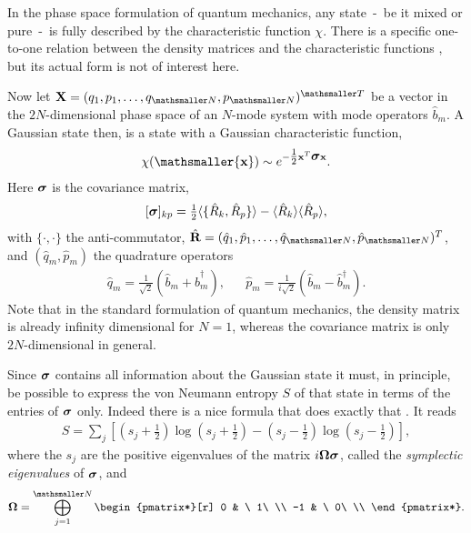 \documentclass[11pt, a4paper]{article}
\def\bx{{\bf x}}
\newcommand{\Om}{\Omega}
\newcommand{\si}{{\sigma}}
\newcommand{\sfrac}[2]{{\textstyle\frac{#1}{#2}}}
\newcommand{\half}{\sfrac{1}{2}}
\newcommand{\gv}[1]{\ensuremath{\mbox{\boldmath $#1$}}}
\newcommand{\mb}{\mathbf}
\newcommand{\ms}{\mathsmaller}
\begin{document}
In the phase space formulation of quantum mechanics, any state~-~be it mixed or pure~-~is fully described by the characteristic function $\chi$. There is a specific one-to-one relation between the density matrices and the characteristic functions \cite{Adesso}, but its actual form is not of interest here. 

Now let $\mb{X}=(q_1,p_1,\ldots,q_{\ms N},p_{\ms N} )^{\ms T}$ be a vector in the $2N$-dimensional phase space of an $N$-mode system with mode operators $\hat b_m$. A Gaussian state then, is a state with a Gaussian characteristic function, 
\begin{align}
\label{eq:characteristicFunction}
\chi(\ms\bx)\sim e^{-\half  \bx^T \gv \si \bx}.
\end{align}
Here $\gv \sigma$ is the covariance matrix,
\begin{align}
\label{eq:covarianceMatrix}
	[\gv \si]_{kp}=\half\langle\{\hat R_k,\hat R_p\}\rangle-\langle \hat R_k\rangle\langle \hat R_p\rangle,
\end{align}
with $\{\cdot,\cdot\}$ the anti-commutator, $
\hat{\mb{R}}=(\hat q_1,\hat p_1, \ldots,\hat q_{\mathsmaller N},\hat p_{\mathsmaller N})^T$,
and $(\hat q_m,\hat p_m)$ the quadrature operators
\begin{align}
\label{eq:quadratures}
\hat q_m=\frac{1}{\sqrt{2}}(\hat b_m+\hat b_m^\dagger), &&\hat p_m=\frac{1}{i\sqrt{2}}(\hat b_m-\hat b_m^\dagger).
\end{align}
Note that in the standard formulation of quantum mechanics, the density matrix is already infinity dimensional for $N=1$, whereas the covariance  matrix is only $2N$-dimensional in general. 

Since $\gv \si$ contains all information about the Gaussian state it must, in principle, be possible to express the von Neumann entropy $S$ of that state in terms of the entries of $\gv \si$ only. Indeed there is a nice formula that does exactly that \cite{Demarie}. It reads
\begin{align}
\label{eq:entropy}	
S=\sum_{j} \left[\left(s_j+\half\right)\log\left(s_j+\half\right)-\left(s_j-\half\right)\log\left(s_j-\half\right)\right],
\end{align}
where the $s_j$ are the positive eigenvalues of the matrix $i\gv\Om\gv\si$, called the \emph{symplectic eigenvalues} of $\gv\si$, and 
\begin{align*}	
\gv\Omega=\bigoplus_{j=1}^{\mathsmaller N}
\begin{pmatrix*}[r]
0 & \ 1\ \\
-1 & \ 0\ \\
\end{pmatrix*}.
\end{align*}
\end{document}
